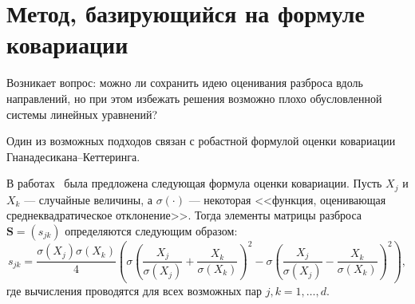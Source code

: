 
    



\section{Метод, базирующийся на формуле ковариации}



Возникает вопрос: можно ли сохранить идею оценивания разброса вдоль направлений, но при этом избежать решения возможно плохо обусловленной системы линейных уравнений?

Один из возможных подходов связан с робастной формулой оценки ковариации Гнанадесикана--Кеттеринга.

В работах~\cite{devlin1981robust,gnanadesikan1972robust} была предложена следующая формула оценки ковариации. Пусть $X_j$ и $X_k$ --- случайные величины, а $\sigma(\cdot)$ --- некоторая <<функция, оценивающая среднеквадратическое отклонение>>. Тогда элементы матрицы разброса $\mathbf{S} = (s_{jk})$ определяются следующим образом:
\begin{equation}\label{eq:gnanadesikan1972}
s_{jk} = \frac{\sigma(X_j) \sigma(X_k)}{4} \left( \sigma \left( \frac{X_j}{\sigma(X_j)} + \frac{X_k}{\sigma(X_k)} \right)^2 - \sigma \left( \frac{X_j}{\sigma(X_j)} - \frac{X_k}{\sigma(X_k)} \right)^2 \right),
\end{equation}
где вычисления проводятся для всех возможных пар $j,k=1,\ldots,d$.

